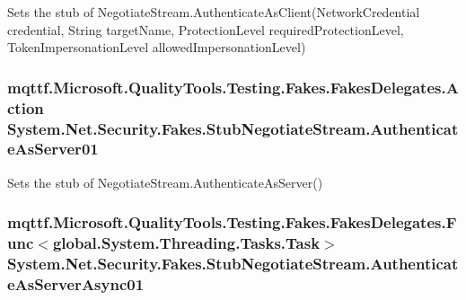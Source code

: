 Sets the stub of Negotiate\-Stream.\-Authenticate\-As\-Client(\-Network\-Credential credential, String target\-Name, Protection\-Level required\-Protection\-Level, Token\-Impersonation\-Level allowed\-Impersonation\-Level)

\hypertarget{class_system_1_1_net_1_1_security_1_1_fakes_1_1_stub_negotiate_stream_ae8cf332d907c72194bf2841aa0b42d8b}{
\subsubsection[{Authenticate\-As\-Server01}]{\setlength{\rightskip}{0pt plus 5cm}mqttf.\-Microsoft.\-Quality\-Tools.\-Testing.\-Fakes.\-Fakes\-Delegates.\-Action System.\-Net.\-Security.\-Fakes.\-Stub\-Negotiate\-Stream.\-Authenticate\-As\-Server01}}\label{class_system_1_1_net_1_1_security_1_1_fakes_1_1_stub_negotiate_stream_ae8cf332d907c72194bf2841aa0b42d8b}


Sets the stub of Negotiate\-Stream.\-Authenticate\-As\-Server()

\hypertarget{class_system_1_1_net_1_1_security_1_1_fakes_1_1_stub_negotiate_stream_af93dd35e38c6f8545bd4900284fb911b}{
\subsubsection[{Authenticate\-As\-Server\-Async01}]{\setlength{\rightskip}{0pt plus 5cm}mqttf.\-Microsoft.\-Quality\-Tools.\-Testing.\-Fakes.\-Fakes\-Delegates.\-Func$<$global.\-System.\-Threading.\-Tasks.\-Task$>$ System.\-Net.\-Security.\-Fakes.\-Stub\-Negotiate\-Stream.\-Authenticate\-As\-Server\-Async01}}\label{class_system_1_1_net_1_1_security_1_1_fakes_1_1_stub_negotiate_stream_af93dd35e38c6f8545bd4900284fb911b}


